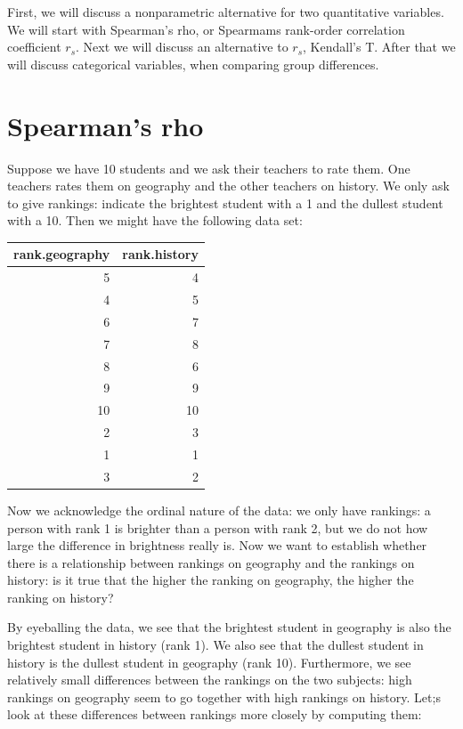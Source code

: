\documentclass[]{report}\usepackage[]{graphicx}\usepackage[]{color}
\newenvironment{knitrout}{}{} %
\begin{document}
First, we will discuss a nonparametric alternative for two quantitative variables. We will start with Spearman's rho, or Spearmams rank-order correlation coefficient $r_s$. Next we will discuss an alternative to $r_s$, Kendall's T. After that we will discuss categorical variables, when comparing group differences.

\section{Spearman's rho}


Suppose we have 10 students and we ask their teachers to rate them. One teachers rates them on geography and the other teachers on history. We only ask to give rankings: indicate the brightest student with a 1 and the dullest student with a 10. Then we might have the following data set:



\begin{knitrout}
\color{fgcolor}
\begin{tabular}{r|r}
\hline
rank.geography & rank.history\\
\hline
5 & 4\\
\hline
4 & 5\\
\hline
6 & 7\\
\hline
7 & 8\\
\hline
8 & 6\\
\hline
9 & 9\\
\hline
10 & 10\\
\hline
2 & 3\\
\hline
1 & 1\\
\hline
3 & 2\\
\hline
\end{tabular}


\end{knitrout}

Now we acknowledge the ordinal nature of the data: we only have rankings: a person with rank 1 is brighter than a person with rank 2, but we do not how large the difference in brightness really is.  Now we want to establish whether there is a relationship between rankings on geography and the rankings on history: is it true that the higher the ranking on geography, the higher the ranking on history?


By eyeballing the data, we see that the brightest student in geography is also the brightest student in history (rank 1). We also see that the dullest student in history is the dullest student in geography (rank 10). Furthermore, we see relatively small differences between the rankings on the two subjects: high rankings on geography seem to go together with high rankings on history. Let;s look at these differences between rankings more closely by computing them:
\end{document}
